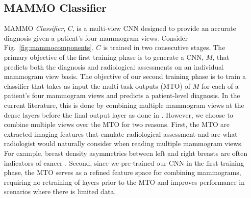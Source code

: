 \documentclass[journal]{IEEEtran}
\begin{document}
\subsection{MAMMO Classifier}
MAMMO \textit{Classifier}, $C$, is a multi-view CNN designed to provide an accurate diagnosis given a patient's four mammogram views. Consider Fig.~\ref{fig:mammocomponents}, $C$ is trained in two consecutive stages.  
The primary objective of the first training phase is to generate a CNN, $M$, that predicts both the diagnosis and radiological assessments on an individual mammogram view basis. 
The objective of our second training phase is to train a classifier that takes as input the multi-task outputs (MTO) of $M$ for each of a patient’s four mammogram views and predicts a patient-level diagnosis. In the current literature, this is done by combining multiple mammogram views at the dense layers before the final output layer as done in \cite{krysztof-etal-2017, carneiro-2017}. However, we choose to combine multiple views over the MTO for two reasons.  First, the MTO are extracted imaging features that emulate radiological assessment and are what radiologist would naturally consider when reading multiple mammogram views. For example, breast density asymmetries between left and right breasts are often indicators of cancer \cite{breast-asymmetry1}. Second, since we pre-trained our CNN in the first training phase, the MTO serves as a refined feature space for combining mammograms, requiring no retraining of layers prior to the MTO and improves performance in scenarios where there is limited data.  
\end{document}
